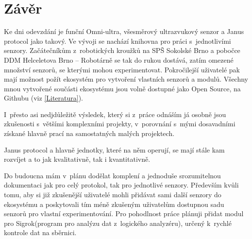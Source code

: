 \newpage
\chapter*{Závěr}

Ke dni odevzdání je funční Omni-ultra, všesměrový ultrazvukový senzor a Janus protocol jako takový.
Ve vývoji se nachází knihovna pro práci s~jednotlivími senzory.
Začátečníkům z~robotických kroužků na SPŠ Sokolské Brno\cite{sokolska} a pobočce DDM Helceletova Brno -- Robotárně\cite{robotarna} se tak do rukou dostává, zatím omezené množství senzorů, se kterými mohou experimentovat.
Pokročilejší uživatelé pak mají možnost požít ekosystém pro vytvoření vlastních senzorů a modulů.
Všechny mnou vytvořené součásti ekosystému jsou volně dostupné jako Open Source, na Githubu (viz \ref{Literatura}).

I~přesto asi nedjdůležitě výsledek, který si z~práce odnáším já osobně jsou zkušenosti s~většími komplexními projekty, v~porovnání s~mými dosavadními získané hlavně prací na samostatných malých projektech.

Janus protocol a hlavně jednotky, které na něm operují, se mají stále kam rozvíjet a to jak kvalitativně, tak i kvantitativně.

Do budoucna mám v~plánu dodělat komplení a jednoduše srozumitelnou dokumentaci jak pro celý protokol, tak pro jednotlivé senzory.
Především kvůli tomu, aby si již zkušenější uživatelé mohli přidávat sami další senzory do ekosystému a poskytovali tím méně zkušeným uživatelům dostupnou sadu senzorů pro vlastní experimentování.
Pro pohodlnost práce plánuji přidat modul pro Sigrok(program pro analýzu dat z~logického analyzéru), určený k~rychlé kontrole dat na sběrnici.
